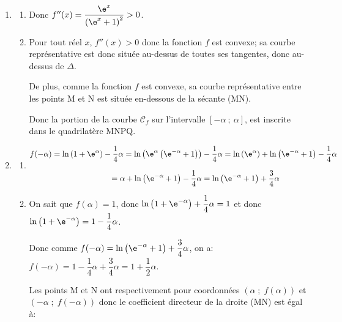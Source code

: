 \smallskip

\begin{enumerate}
\item 
	\begin{enumerate}
		\item 
{}		

Donc $f''(x) = \dfrac{\e^x}{\left(\e^x + 1\right)^2}>0$.

		\item
Pour tout réel $x$, $f''(x)>0$ donc la fonction $f$ est convexe; sa courbe représentative est donc située au-dessus de toutes ses tangentes, donc au-dessus de $\Delta$.

De plus, comme la fonction $f$ est convexe, sa courbe représentative entre les points M et N est située en-dessous de la sécante (MN).

Donc  la portion de la courbe $\mathcal{C}_f$ sur l'intervalle $[-\alpha~;~\alpha]$, est inscrite dans le quadrilatère MNPQ.
	\end{enumerate}
	
\item 	
	\begin{enumerate}
		\item 
$\begin{gathered}f(-\alpha) = \ln\left (1+\e^{\alpha}\right ) -\dfrac{1}{4}\alpha
= \ln \left (\e^{\alpha} \left (\e^{-\alpha}+1\right )\right ) -\dfrac{1}{4}\alpha
= \ln\left (\e^{\alpha}\right ) + \ln \left (\e^{-\alpha}+1\right ) -\dfrac{1}{4}\alpha\\[7pt]
\phantom{f(-\alpha)}
= \alpha + \ln \left (\e^{-\alpha}+1\right ) -\dfrac{1}{4}\alpha
= \ln \left (\e^{-\alpha}+1\right )+ \dfrac{3}{4}\alpha\end{gathered}$
		
		\item 
On sait que $f(\alpha)=1$, donc $\ln\left (1+\e^{-\alpha}\right )+\dfrac{1}{4}\alpha = 1$ et donc $\ln\left (1+\e^{-\alpha}\right ) = 1-\dfrac{1}{4}\alpha$.

Donc comme $f(-\alpha) = \ln \left (\e^{-\alpha}+1\right )+ \dfrac{3}{4}\alpha$, on a:
$f(-\alpha) = 1-\dfrac{1}{4}\alpha + \dfrac{3}{4}\alpha = 1+\dfrac{1}{2}\alpha$.


Les points M et N ont respectivement pour coordonnées $\left (\alpha\;;\;f(\alpha)\right )$ et $\left (-\alpha\;;\;f(-\alpha)\right )$ donc le coefficient directeur de la droite (MN) est égal à:


\end{enumerate}
\end{enumerate}
